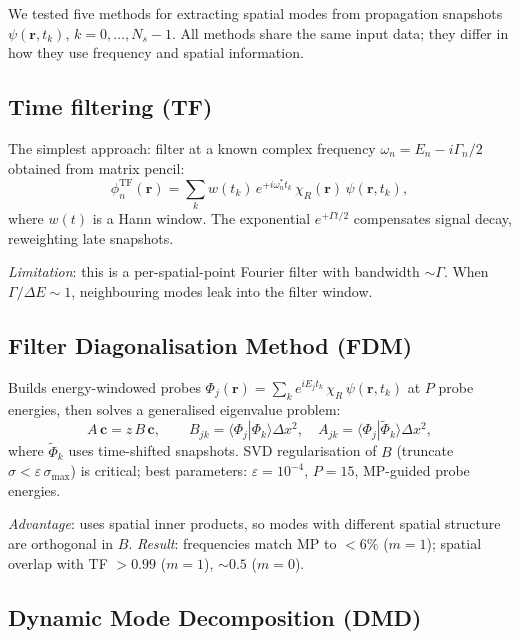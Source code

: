 \documentclass[11pt,a4paper]{article}
\newcommand{\vb}[1]{\mathbf{#1}}
\begin{document}
We tested five methods for extracting spatial modes from propagation
snapshots $\psi(\vb{r}, t_k)$, $k = 0, \ldots, N_s-1$.  All methods
share the same input data; they differ in how they use frequency
and spatial information.

\subsection{Time filtering (TF)}

The simplest approach: filter at a known complex frequency
$\omega_n = E_n - i\Gamma_n/2$ obtained from matrix pencil:
\begin{equation}
  \phi_n^\text{TF}(\vb{r}) = \sum_k w(t_k)\, e^{+i\omega_n^* t_k}\,
  \chi_R(\vb{r})\,\psi(\vb{r}, t_k),
\end{equation}
where $w(t)$ is a Hann window.  The exponential $e^{+\Gamma t/2}$
compensates signal decay, reweighting late snapshots.

\emph{Limitation}: this is a per-spatial-point Fourier filter with
bandwidth $\sim\Gamma$.  When $\Gamma/\Delta E \sim 1$, neighbouring
modes leak into the filter window.

\subsection{Filter Diagonalisation Method (FDM)}

Builds energy-windowed probes
$\Phi_j(\vb{r}) = \sum_k e^{iE_j t_k}\,\chi_R\,\psi(\vb{r},t_k)$
at $P$ probe energies, then solves a generalised eigenvalue problem:
\begin{equation}
  A\,\vb{c} = z\,B\,\vb{c},\qquad
  B_{jk} = \langle\Phi_j|\Phi_k\rangle\Delta x^2,\quad
  A_{jk} = \langle\Phi_j|\tilde\Phi_k\rangle\Delta x^2,
\end{equation}
where $\tilde\Phi_k$ uses time-shifted snapshots.
SVD regularisation of $B$ (truncate $\sigma < \varepsilon\,\sigma_\text{max}$)
is critical; best parameters: $\varepsilon = 10^{-4}$, $P = 15$,
MP-guided probe energies.

\emph{Advantage}: uses spatial inner products, so modes with
different spatial structure are orthogonal in $B$.
\emph{Result}: frequencies match MP to $<6\%$ ($m=1$); spatial overlap
with TF $>0.99$ ($m=1$), $\sim 0.5$ ($m=0$).

\subsection{Dynamic Mode Decomposition (DMD)}
\end{document}

